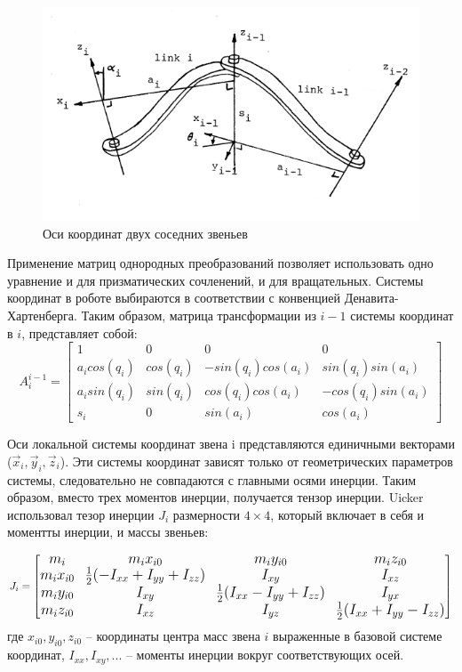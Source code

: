 	\begin{figure}[H]
	\center\includegraphics[width=0.8\linewidth]{1.png}
	\caption{Оси координат двух соседних звеньев}
	\label{fig:scr1}
	\end{figure}

Применение матриц однородных преобразований позволяет использовать одно уравнение и для призматических сочленений, и для вращательных. Системы координат в роботе выбираются в соответствии с конвенцией Денавита-Хартенберга. Таким образом, матрица трансформации из $i-1$ системы координат в $i$, представляет собой:
\begin{equation}
A_i^{i-1} = 
\begin{bmatrix}
1 & 0 & 0 & 0\\
a_i cos (q_i) & cos (q_i) & -sin (q_i) cos (a_i) & sin (q_i) sin (a_i)\\
a_i sin (q_i) & sin (q_i) & cos (q_i) cos (a_i) & -cos (q_i) sin (a_i)\\
s_i & 0 & sin (a_i) & cos (a_i)
\end{bmatrix}
\end{equation}

Оси локальной системы координат звена i представляются единичными векторами ($\vec x_i, \vec y_i, \vec z_i$). Эти системы координат зависят только от геометрических параметров системы, следовательно не совпадаются с главными осями инерции. Таким образом, вместо трех моментов инерции, получается тензор инерции. Uicker использовал тезор инерции $J_i$ размерности $4 \times 4$, который включает в себя и моментты инерции, и массы звеньев:


\begin{equation}
\begingroup\makeatletter\def\f@size{14}\check@mathfonts
J_i = 
\begin{bmatrix}
m_i & m_i x_{i0} & m_i y_{i0} & m_i z_{i0}\\
m_i x_{i0} & \frac{1}{2} (-I_{xx} + I_{yy} + I_{zz}) & I_{xy} & I_{xz}\\
m_i y_{i0} & I_{xy} & \frac{1}{2} (I_{xx} - I_{yy} + I_{zz}) & I_{yx} \\
m_i z_{i0} & I_{xz} & I_{yz} & \frac{1}{2} (I_{xx} + I_{yy} - I_{zz})
\end{bmatrix}
\endgroup
\end{equation}
где $x_{i0}, y_{i0}, z_{i0}$ -- координаты центра масс звена $i$ выраженные в базовой системе координат, $I_{xx}, I_{xy},...$ -- моменты инерции вокруг соответствующих осей.

